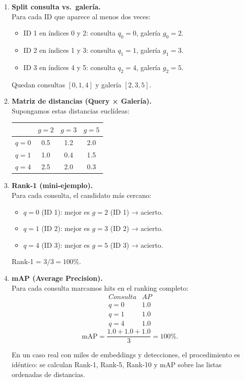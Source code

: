 \documentclass[12pt, a4paper, twoside]{article}
\begin{document}
 	\bigskip
 	
 	\begin{enumerate}
 		\item \textbf{Split consulta vs.\ galería.}\\
 		Para cada ID que aparece al menos dos veces:
 		\begin{itemize}
 			\item ID 1 en índices 0 y 2: consulta $q_0=0$, galería $g_0=2$.
 			\item ID 2 en índices 1 y 3: consulta $q_1=1$, galería $g_1=3$.
 			\item ID 3 en índices 4 y 5: consulta $q_2=4$, galería $g_2=5$.
 		\end{itemize}
 		Quedan consultas $[0,1,4]$ y galería $[2,3,5]$.
 		
 		\item \textbf{Matriz de distancias (Query × Galería).}\\
 		Supongamos estas distancias euclídeas:
 		\begin{center}
 			\begin{tabular}{c|ccc}
 				& $g=2$ & $g=3$ & $g=5$ \\ \hline
 				$q=0$ & 0.5 & 1.2 & 2.0 \\
 				$q=1$ & 1.0 & 0.4 & 1.5 \\
 				$q=4$ & 2.5 & 2.0 & 0.3
 			\end{tabular}
 		\end{center}
 		
 		\item \textbf{Rank-1 (mini-ejemplo).}\\
 		Para cada consulta, el candidato más cercano:
 		\begin{itemize}
 			\item $q=0$ (ID 1): mejor es $g=2$ (ID 1) → acierto.
 			\item $q=1$ (ID 2): mejor es $g=3$ (ID 2) → acierto.
 			\item $q=4$ (ID 3): mejor es $g=5$ (ID 3) → acierto.
 		\end{itemize}
 		Rank-1 = $3/3 = 100\%$.
 		
 		\item \textbf{mAP (Average Precision).}\\
 		Para cada consulta marcamos hits en el ranking completo:
 		\[
 		\begin{array}{l|c}
 			Consulta & AP \\ \hline
 			q=0 & 1.0 \\
 			q=1 & 1.0 \\
 			q=4 & 1.0
 		\end{array}
 		\]
 		\[
 		\mathrm{mAP} = \frac{1.0 + 1.0 + 1.0}{3} = 100\%.
 		\]
 		
 		En un caso real con miles de embeddings y detecciones, el procedimiento es idéntico: 
 		se calculan Rank-1, Rank-5, Rank-10 y mAP sobre las listas ordenadas de distancias.
 	\end{enumerate}
 	
\end{document}
